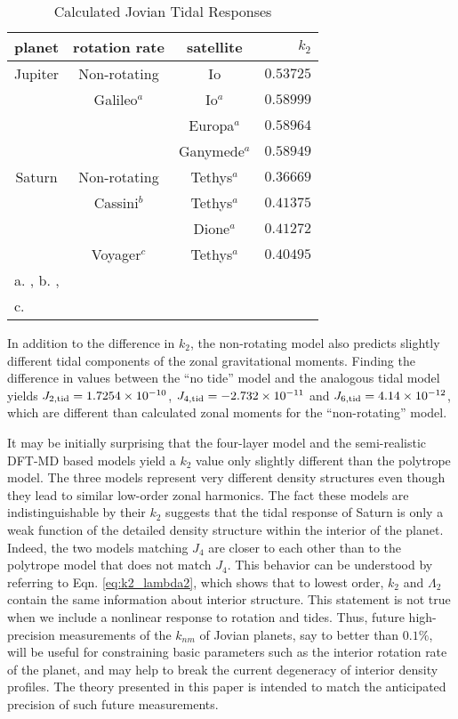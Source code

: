%
\begin{table}
    \centering
\caption{Calculated Jovian Tidal Responses\label{tab:combined_table}}
\begin{tabular}{ccc|r}
    \hline
    {planet} & rotation rate & satellite  & $k_2$\\
    \hline
{Jupiter}  &  {Non-rotating}              &  {Io}
&  $0.53725$  \\
\hline
{}         &  {Galileo$^{a}$}  &
{Io$^{a}$}        &  $0.58999$  \\
{}         &  {}                          &
{Europa$^{a}$}    &  $0.58964$  \\
{}         &  {}                          &
{Ganymede$^{a}$}  &  $0.58949$  \\
\hline
{Saturn}   &  {Non-rotating}              &  {Tethys$^{a}$}    &  $0.36669$  \\
\hline
{}         &  {Cassini$^{b}$}  &
{Tethys$^{a}$}    &  $0.41375$  \\
{}         &  {}                          &
{Dione$^{a}$}     &  $0.41272$  \\
\hline
{}         &  {Voyager$^{c}$}  &
{Tethys$^{a}$}    &  $0.40495$  \\
\hline
\multicolumn{4}{l}{ a. \citet{archinal2011}, b. \citet{giampieri2006},} \\
\multicolumn{4}{l}{c. \citet{desch1981}}
\end{tabular}
\end{table}

In addition to the difference in $k_2$, the non-rotating model also predicts slightly
different tidal components of the zonal gravitational moments. Finding the difference
in values between the ``no tide'' model and the analogous tidal model yields
$J_{2,{\rm tid}}=1.7254\times10^{-10}$, $J_{4,{\rm tid}}=-2.732\times10^{-11}$ and
$J_{6,{\rm tid}}=4.14\times10^{-12}$, which are different than calculated zonal
moments for the ``non-rotating'' model.

It may be initially surprising that the four-layer model and the semi-realistic
DFT-MD based models  yield a $k_2$ value only slightly different than the
polytrope model. The three models represent very different density structures
even though they lead to similar low-order zonal harmonics. The fact these
models are indistinguishable by their $k_2$ suggests that the tidal response of
Saturn is only a weak function of the detailed density structure within the
interior of the planet. Indeed, the two models matching $J_4$ are closer to
each other than to the polytrope model that does not match $J_4$. This behavior
can be understood by referring to Eqn.  \eqref{eq:k2_lambda2}, which shows that
to lowest order, $k_2$ and $\Lambda_2$ contain the same information about
interior structure.  This statement is not true when we include a nonlinear
response to rotation and tides.  Thus, future high-precision measurements of
the $k_{nm}$ of Jovian planets, say to better than $0.1\%$, will be useful for
constraining basic parameters such as the interior rotation rate of the planet,
and may help to break the current degeneracy of interior density profiles.  The
theory presented in this paper is intended to match the anticipated precision
of such future measurements.

